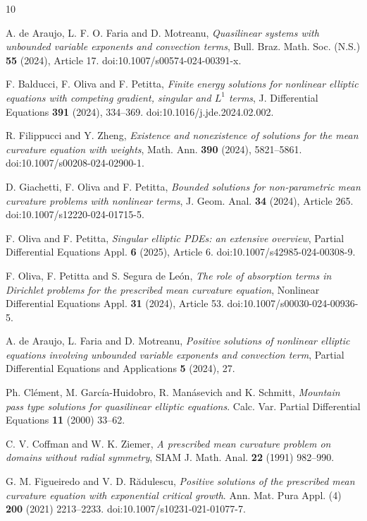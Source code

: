 \documentclass[11pt,leqno]{amsart}
\begin{document}
\begin{thebibliography}{10}


A. de Araujo, L. F. O. Faria and D. Motreanu,
{\em Quasilinear systems with unbounded variable exponents and convection terms},
Bull. Braz. Math. Soc. (N.S.) \textbf{55} (2024), Article 17.
doi:10.1007/s00574-024-00391-x.

F. Balducci, F. Oliva and F. Petitta,
{\em Finite energy solutions for nonlinear elliptic equations with competing
gradient, singular and $L^1$ terms},
J. Differential Equations \textbf{391} (2024), 334--369.
doi:10.1016/j.jde.2024.02.002.

R. Filippucci and Y. Zheng,
{\em Existence and nonexistence of solutions for the mean curvature equation
with weights},
Math. Ann. \textbf{390} (2024), 5821--5861.
doi:10.1007/s00208-024-02900-1.

D. Giachetti, F. Oliva and F. Petitta,
{\em Bounded solutions for non-parametric mean curvature problems with
nonlinear terms},
J. Geom. Anal. \textbf{34} (2024), Article 265.
doi:10.1007/s12220-024-01715-5.

F. Oliva and F. Petitta,
{\em Singular elliptic PDEs: an extensive overview},
Partial Differential Equations Appl. \textbf{6} (2025), Article 6.
doi:10.1007/s42985-024-00308-9.

F. Oliva, F. Petitta and S. Segura de Le\'on,
{\em The role of absorption terms in Dirichlet problems for the prescribed
mean curvature equation},
Nonlinear Differential Equations Appl. \textbf{31} (2024), Article 53.
doi:10.1007/s00030-024-00936-5.


A. de Araujo, L. Faria and D. Motreanu,
{\em Positive solutions of nonlinear elliptic equations involving
unbounded variable exponents and convection term},
Partial Differential Equations and Applications \textbf{5} (2024), 27.


 Ph. Cl\'ement, M. Garc\'ia-Huidobro, R. Man\'asevich and K. Schmitt, {\em Mountain pass type solutions for quasilinear elliptic equations}. Calc. Var. Partial Differential Equations \textbf{11} (2000) 33--62.

 C. V. Coffman and W. K. Ziemer, {\em A prescribed mean curvature problem on domains without radial symmetry}, SIAM J. Math. Anal. \textbf{22} (1991) 982--990.

 G. M. Figueiredo and V. D. R\u{a}dulescu, {\em Positive solutions of the prescribed mean curvature equation with exponential critical growth}. Ann. Mat. Pura Appl. (4) \textbf{200} (2021) 2213--2233. doi:10.1007/s10231-021-01077-7.


\end{thebibliography}
\end{document}

